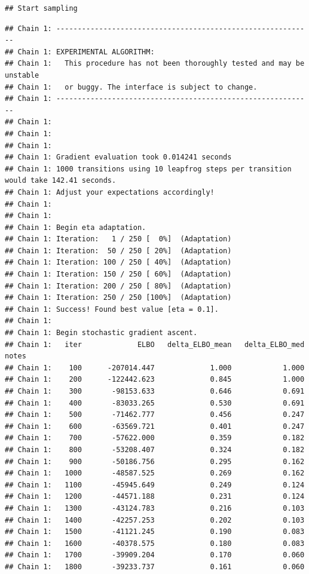 \documentclass[
]{article}
\begin{document}
\begin{verbatim}
## Start sampling
\end{verbatim}

\begin{verbatim}
## Chain 1: ------------------------------------------------------------
## Chain 1: EXPERIMENTAL ALGORITHM:
## Chain 1:   This procedure has not been thoroughly tested and may be unstable
## Chain 1:   or buggy. The interface is subject to change.
## Chain 1: ------------------------------------------------------------
## Chain 1: 
## Chain 1: 
## Chain 1: 
## Chain 1: Gradient evaluation took 0.014241 seconds
## Chain 1: 1000 transitions using 10 leapfrog steps per transition would take 142.41 seconds.
## Chain 1: Adjust your expectations accordingly!
## Chain 1: 
## Chain 1: 
## Chain 1: Begin eta adaptation.
## Chain 1: Iteration:   1 / 250 [  0%]  (Adaptation)
## Chain 1: Iteration:  50 / 250 [ 20%]  (Adaptation)
## Chain 1: Iteration: 100 / 250 [ 40%]  (Adaptation)
## Chain 1: Iteration: 150 / 250 [ 60%]  (Adaptation)
## Chain 1: Iteration: 200 / 250 [ 80%]  (Adaptation)
## Chain 1: Iteration: 250 / 250 [100%]  (Adaptation)
## Chain 1: Success! Found best value [eta = 0.1].
## Chain 1: 
## Chain 1: Begin stochastic gradient ascent.
## Chain 1:   iter             ELBO   delta_ELBO_mean   delta_ELBO_med   notes 
## Chain 1:    100      -207014.447             1.000            1.000
## Chain 1:    200      -122442.623             0.845            1.000
## Chain 1:    300       -98153.633             0.646            0.691
## Chain 1:    400       -83033.265             0.530            0.691
## Chain 1:    500       -71462.777             0.456            0.247
## Chain 1:    600       -63569.721             0.401            0.247
## Chain 1:    700       -57622.000             0.359            0.182
## Chain 1:    800       -53208.407             0.324            0.182
## Chain 1:    900       -50186.756             0.295            0.162
## Chain 1:   1000       -48587.525             0.269            0.162
## Chain 1:   1100       -45945.649             0.249            0.124
## Chain 1:   1200       -44571.188             0.231            0.124
## Chain 1:   1300       -43124.783             0.216            0.103
## Chain 1:   1400       -42257.253             0.202            0.103
## Chain 1:   1500       -41121.245             0.190            0.083
## Chain 1:   1600       -40378.575             0.180            0.083
## Chain 1:   1700       -39909.204             0.170            0.060
## Chain 1:   1800       -39233.737             0.161            0.060

\end{verbatim}
\end{document}
